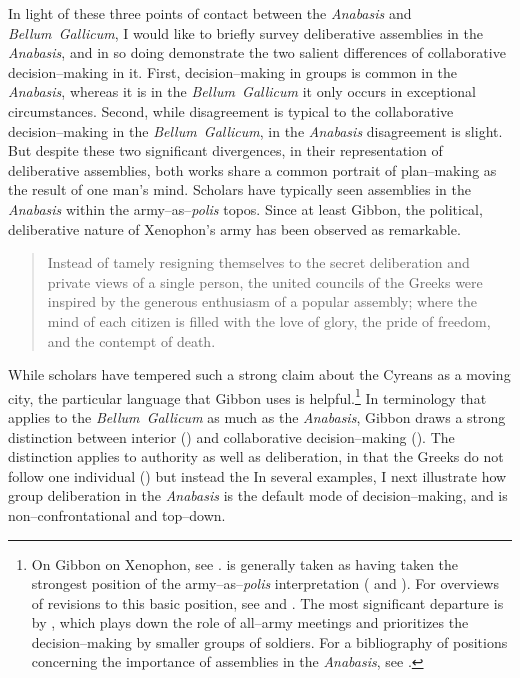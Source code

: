 \documentclass[12pt,letterpaper,oneside,final]{memoir}
\begin{document}
In light of these three points of contact between the \emph{Anabasis} and \emph{Bellum~Gallicum}, I would like to briefly survey deliberative assemblies in the \emph{Anabasis}, and in so doing demonstrate the two salient differences of collaborative decision--making in it. First, decision--making in groups is common in the \emph{Anabasis}, whereas it is in the \emph{Bellum~Gallicum} it only occurs in exceptional circumstances. Second, while disagreement is typical to the collaborative decision--making in the \emph{Bellum~Gallicum}, in the \emph{Anabasis} disagreement is slight. But despite these two significant divergences, in their representation of deliberative assemblies, both works share a common portrait of plan--making as the result of one man's mind. Scholars have typically seen assemblies in the \emph{Anabasis} within the army--as--\emph{polis} topos. Since at least Gibbon, the political, deliberative nature of Xenophon's army has been observed as remarkable. \blockquote[{\cite[pp.~373--374, ch.~24]{gibbon1846}}]{Instead of tamely resigning themselves to the secret deliberation and private views of a single person, the united councils of the Greeks were inspired by the generous enthusiasm of a popular assembly; where the mind of each citizen is filled with the love of glory, the pride of freedom, and the contempt of death.} While scholars have tempered such a strong claim about the Cyreans as a moving city, the particular language that Gibbon uses is helpful.\footnote{On Gibbon on Xenophon, see \textcite[31]{hornblower2008}. \textcite{nussbaum1967} is generally taken as having taken the strongest position of the army--as--\emph{polis} interpretation (\cite[16--17]{dalby1992} and \cite[9--10]{lee2007}). For overviews of revisions to this basic position, see \textcite[30--32]{hornblower2008} and \textcite[especially pp.~9--11]{lee2007}. The most significant departure is by \textcite[see especially pp.~80--108]{lee2007}, which plays down the role of all--army meetings and prioritizes the decision--making by smaller groups of soldiers. For a bibliography of positions concerning the importance of assemblies in the \emph{Anabasis}, see \textcite[p.~10, n.~40]{lee2007}.} In terminology that applies to the \emph{Bellum~Gallicum} as much as the \emph{Anabasis}, Gibbon draws a strong distinction between interior () and collaborative decision--making (). The distinction applies to authority as well as deliberation, in that the Greeks do not follow one individual () but instead the  In several examples, I next illustrate how group deliberation in the \emph{Anabasis} is the default mode of decision--making, and is non--confrontational and top--down. 
\end{document}
